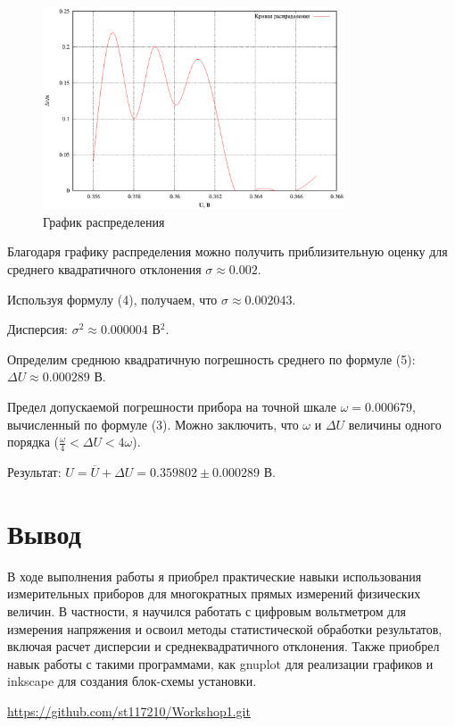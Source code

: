 \begin{figure}[ht!]
\centering
\includegraphics[width=0.8\textwidth]{delta_n_vs_voltage.eps}
\caption{График распределения}
\label{fig:plot3}
\end{figure}

Благодаря графику распределения можно получить приблизительную оценку для среднего квадратичного отклонения $\sigma \approx 0.002$. 

Используя формулу (4), получаем, что $\sigma \approx 0.002043$.

Дисперсия: $\sigma^2 \approx 0.000004$ В$^2$.

Определим среднюю квадратичную погрешность среднего по формуле (5): $\Delta U \approx 0.000289$ В.


Предел допускаемой погрешности прибора на точной шкале $\omega = 0.000679$, вычисленный по формуле (3). Можно  заключить, что $\omega$ и $\Delta U$ величины одного порядка ($\frac{\omega}{4} < \Delta U < 4\omega$).

Результат: $U = \overline{U}  + \Delta U= 0.359802 \pm 0.000289$ В.

\section{Вывод}
В ходе выполнения работы я приобрел практические навыки использования измерительных приборов для многократных прямых измерений физических величин. В частности, я научился работать с цифровым вольтметром для измерения напряжения и освоил методы статистической обработки результатов, включая расчет дисперсии и среднеквадратичного отклонения. Также приобрел навык работы с такими программами, как gnuplot для реализации графиков и inkscape для создания блок-схемы установки. 
\begin{thebibliography}{9}

\url{https://github.com/st117210/Workshop1.git}  

\end{thebibliography}
\clearpage
\appendix